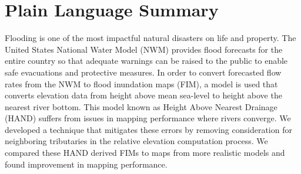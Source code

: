 \section*{Plain Language Summary}
Flooding is one of the most impactful natural disasters on life and property.
The United States National Water Model (NWM) provides flood forecasts for the entire country so that adequate warnings can be raised to the public to enable safe evacuations and protective measures.
In order to convert forecasted flow rates from the NWM to flood inundation maps (FIM), a model is used that converts elevation data from height above mean sea-level to height above the nearest river bottom.
This model known as Height Above Nearest Drainage (HAND) suffers from issues in mapping performance where rivers converge.
We developed a technique that mitigates these errors by removing consideration for neighboring tributaries in the relative elevation computation process.
We compared these HAND derived FIMs to maps from more realistic models and found improvement in mapping performance.
%
